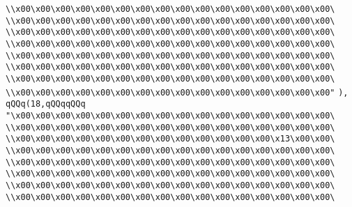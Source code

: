 \verb|\\x00\x00\x00\x00\x00\x00\x00\x00\x00\x00\x00\x00\x00\x00\x00\x00\|\newline
\verb|\\x00\x00\x00\x00\x00\x00\x00\x00\x00\x00\x00\x00\x00\x00\x00\x00\|\newline
\verb|\\x00\x00\x00\x00\x00\x00\x00\x00\x00\x00\x00\x00\x00\x00\x00\x00\|\newline
\verb|\\x00\x00\x00\x00\x00\x00\x00\x00\x00\x00\x00\x00\x00\x00\x00\x00\|\newline
\verb|\\x00\x00\x00\x00\x00\x00\x00\x00\x00\x00\x00\x00\x00\x00\x00\x00\|\newline
\verb|\\x00\x00\x00\x00\x00\x00\x00\x00\x00\x00\x00\x00\x00\x00\x00\x00\|\newline
\verb|\\x00\x00\x00\x00\x00\x00\x00\x00\x00\x00\x00\x00\x00\x00\x00\x00\|\newline
\verb|\\x00\x00\x00\x00\x00\x00\x00\x00\x00\x00\x00\x00\x00\x00\x00\x00"|\newline
\verb|),|\newline
\verb|qQQq(18,qQQqqQQq|\newline
\verb|"\x00\x00\x00\x00\x00\x00\x00\x00\x00\x00\x00\x00\x00\x00\x00\x00\|\newline
\verb|\\x00\x00\x00\x00\x00\x00\x00\x00\x00\x00\x00\x00\x00\x00\x00\x00\|\newline
\verb|\\x00\x00\x00\x00\x00\x00\x00\x00\x00\x00\x00\x00\x00\x13\x00\x00\|\newline
\verb|\\x00\x00\x00\x00\x00\x00\x00\x00\x00\x00\x00\x00\x00\x00\x00\x00\|\newline
\verb|\\x00\x00\x00\x00\x00\x00\x00\x00\x00\x00\x00\x00\x00\x00\x00\x00\|\newline
\verb|\\x00\x00\x00\x00\x00\x00\x00\x00\x00\x00\x00\x00\x00\x00\x00\x00\|\newline
\verb|\\x00\x00\x00\x00\x00\x00\x00\x00\x00\x00\x00\x00\x00\x00\x00\x00\|\newline
\verb|\\x00\x00\x00\x00\x00\x00\x00\x00\x00\x00\x00\x00\x00\x00\x00\x00\|\newline
